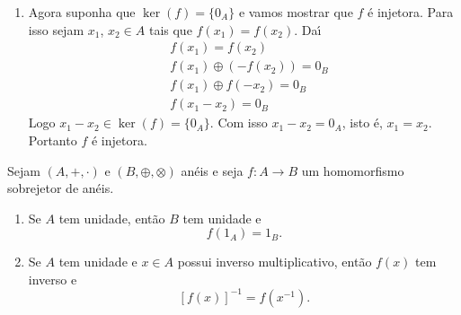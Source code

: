 \documentclass{beamer}
\begin{document}
    \begin{frame}
        \begin{enumerate}
            \item[] Agora suponha que $\ker(f) = \{0_A\}$ e vamos mostrar que $f$ \'e injetora. Para isso sejam $x_1$, $x_2 \in A$ tais que $f(x_1) = f(x_2)$. Da{\'\i}
            \begin{align*}
                &f(x_1) = f(x_2)\\
                &f(x_1) \oplus (-f(x_2)) = 0_B\\
                &f(x_1) \oplus f(-x_2) = 0_B\\
                &f(x_1 - x_2) = 0_B
            \end{align*}
            Logo $x_1 - x_2 \in \ker(f) = \{0_A\}$. Com isso $x_1 - x_2 = 0_A$, isto \'e, $x_1 = x_2$. Portanto $f$ \'e injetora. \hspace{.5cm} \qedsymbol
        \end{enumerate}
    \end{frame}

    \begin{frame}
        \begin{proposicao}
            Sejam $(A, +, \cdot)$ e $(B, \oplus, \otimes)$ an\'eis e seja $f : A \to B$ um homomorfismo sobrejetor de an\'eis.
            \begin{enumerate}[label={\roman*})]
                \item Se $A$ tem unidade, ent\~ao $B$ tem unidade e
                \[
                    f(1_A) = 1_B.
                \]

                \vspace{.5cm}

                \item Se $A$ tem unidade e $x \in A$ possui inverso multiplicativo, ent\~ao $f(x)$ tem inverso e
                \[
                    [f(x)]^{-1} = f(x^{-1}).
                \]

                \vspace{.5cm}
            \end{enumerate}
        \end{proposicao}
    \end{frame}
\end{document}
